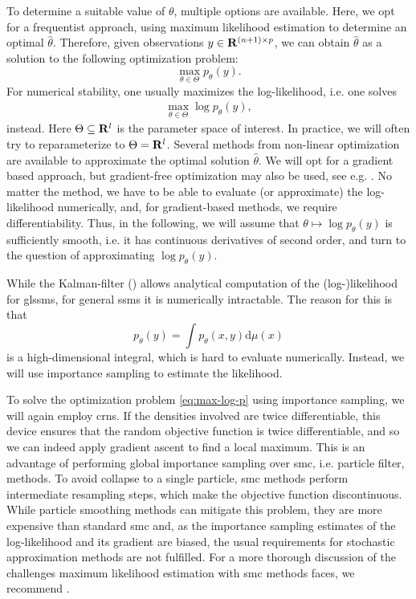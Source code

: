 To determine a suitable value of $\theta$, multiple options are available. Here, we opt for a frequentist approach, using maximum likelihood estimation to determine an optimal $\hat \theta$. Therefore, given observations $y\in\mathbf R^{(n+1)\times p}$, we can obtain $\hat\theta$ as a solution to the following optimization problem:
$$
    \max_{\theta \in \Theta} p_{\theta}(y).
$$
For numerical stability, one usually maximizes the log-likelihood, i.e. one solves
\begin{align}
    \label{eq:max-log-p}
    \max_{\theta \in \Theta} \log p_{\theta}(y),
\end{align}
instead.
Here $\Theta \subseteq \mathbf R^{l}$ is the parameter space of interest. In practice, we will often try to reparameterize to $\Theta = \mathbf R^{l}$. Several methods from non-linear optimization are available to approximate the optimal solution $\hat\theta$. We will opt for a gradient based approach, but gradient-free optimization may also be used, see e.g. \citep[Chapter 14]{Chopin2020Introduction}.
No matter the method, we have to be able to evaluate (or approximate) the log-likelihood numerically, and, for gradient-based methods, we require differentiability. 
Thus, in the following, we will assume that $\theta \mapsto \log p_{\theta}(y)$ is sufficiently smooth, i.e. it has continuous derivatives of second order, and turn to the question of approximating $\log p_{\theta}(y)$.

While the Kalman-filter () allows analytical computation of the (log-)likelihood for \glspl{glssm}, for general \glspl{ssm} it is numerically intractable. The reason for this is that
$$
    p_{\theta}(y) = \int p_{\theta}(x,y) \mathrm d \mu(x)
$$
is a high-dimensional integral, which is hard to evaluate numerically. Instead, we will use importance sampling to estimate the likelihood. 

To solve the optimization problem \eqref{eq:max-log-p} using importance sampling, we will again employ \glspl{crn}. If the densities involved are twice differentiable, this device ensures that the random objective function is twice differentiable, and so we can indeed apply gradient ascent to find a local maximum. This is an advantage of performing global importance sampling over \gls{smc}, i.e. particle filter, methods. To avoid collapse to a single particle, \gls{smc} methods perform intermediate resampling steps, which make the objective function discontinuous. While particle smoothing methods can mitigate this problem, they are more expensive than standard \gls{smc} and, as the importance sampling estimates of the log-likelihood and its gradient are biased, the usual requirements for stochastic approximation methods are not fulfilled.  For a more thorough discussion of the challenges maximum likelihood estimation with \gls{smc} methods faces, we recommend \citep[Chapter 14]{Chopin2020Introduction}.

